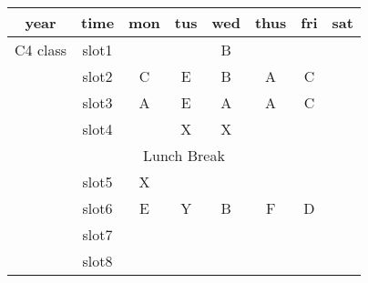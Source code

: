 \documentclass{article}
\begin{document}
\begin{table}[h]
	\begin{tabular}{|c|c|c|c|c|c|c|c|}
		\hline
		\textbf{year} & \textbf{time} & \textbf{mon} & \textbf{tus} &  \textbf{wed} & \textbf{thus} & \textbf{fri} & \textbf{sat} \\
		
		\hline
		
		C4 class&slot1 & & & \cellcolor{red}B &  & &  \\
		
		\cline{2-8}
		&slot2& \cellcolor{orange} C & \cellcolor{yellow} E & \cellcolor{red} B & \cellcolor{purple} A & \cellcolor{orange} C & \\
		\cline{2-8}
		&slot3& \cellcolor{purple} A & \cellcolor{yellow} E & \cellcolor{purple} A & \cellcolor{purple} A &\cellcolor{orange} C & \\
		\cline{2-8}
		&slot4& & \cellcolor{green}X & \cellcolor{green} X &  &  &   \\
		\cline{2-8}
	
		\multicolumn{8}{|c|}{Lunch Break}\\	
		
	
		\cline{2-8}
		&slot5&  \cellcolor{green} X & \cellcolor{blue} & \cellcolor{red} & \cellcolor{yellow}  & \cellcolor{gray} &   \\
		\cline{2-3}
		&slot6& \cellcolor{yellow} E& \cellcolor{blue}  Y&\cellcolor{red}  B &  \cellcolor{yellow} F & \cellcolor{gray} D &   \\
		\cline{2-3}
		&slot7& &\cellcolor{blue}  &\cellcolor{red}  & \cellcolor{yellow}  & \cellcolor{gray}  &   \\
		\cline{2-8}
		&slot8& & &  &  &  &   \\
	
		\hline
		
	
	\end{tabular}
\end{table}
\end{document}
